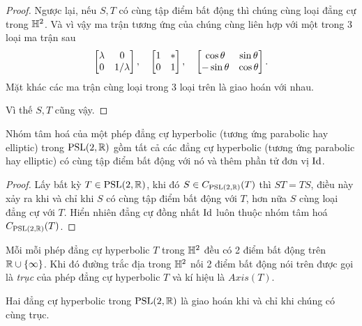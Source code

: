 \begin{proof}
    Ngược lại, nếu $S, T$ có cùng tập điểm bất động thì chúng cùng loại đẳng cự trong $\mathbb{H}^2$. Và vì vậy ma trận tương ứng của chúng cùng liên hợp với một trong 3 loại ma trận sau
    \[\begin{bmatrix}
        \lambda & 0\\
        0  & 1/\lambda
    \end{bmatrix},\quad \begin{bmatrix}
        1 & *\\
        0  & 1
    \end{bmatrix}, \quad \begin{bmatrix} \cos{\theta} & \sin{\theta}\\ -\sin{\theta} & \cos{\theta} \end{bmatrix}.\]
    Mặt khác các ma trận cùng loại trong 3 loại trên là giao hoán với nhau. 
    
    Vì thế $S,T$ cũng vậy.
    \end{proof}
\begin{thm}\label{thm 3.3.7}
    Nhóm tâm hoá của một phép đẳng cự hyperbolic (tương ứng parabolic hay elliptic) trong $\operatorname{PSL}(2,\mathbb{R})$ gồm tất cả các đẳng cự hyperbolic (tương ứng parabolic hay elliptic) có cùng tập điểm bất động với nó và thêm phần tử đơn vị $\operatorname{Id}$.
\end{thm}
\begin{proof}
    Lấy bất kỳ $T \in \operatorname{PSL}(2,\mathbb{R})$, khi đó $S \in C_{\operatorname{PSL}(2,\mathbb{R})}(T)$ thì $ST = TS$, điều này xảy ra khi và chỉ khi $S$ có cùng tập điểm bất động với $T$, hơn nữa $S$ cùng loại đẳng cự với $T$. Hiển nhiên đẳng cự đồng nhất $\operatorname{Id}$ luôn thuộc nhóm tâm hoá $C_{\operatorname{PSL}(2,\mathbb{R})}(T)$.
\end{proof}
\begin{defn}
    Mỗi mỗi phép đẳng cự hyperbolic $T$ trong $\mathbb{H}^2$ đều có 2 điểm bất động trên $\mathbb{R} \cup \{\infty\}$. Khi đó đường trắc địa trong $\mathbb{H}^2$ nối 2 điểm bất động nói trên được gọi là \textit{trục} của phép đẳng cự hyperbolic $T$ và kí hiệu là $Axis(T)$. 
\end{defn}
\begin{cor}
Hai đẳng cự hyperbolic trong $\operatorname{PSL}(2,\mathbb{R})$ là giao hoán khi và chỉ khi chúng có cùng trục.     
\end{cor}

